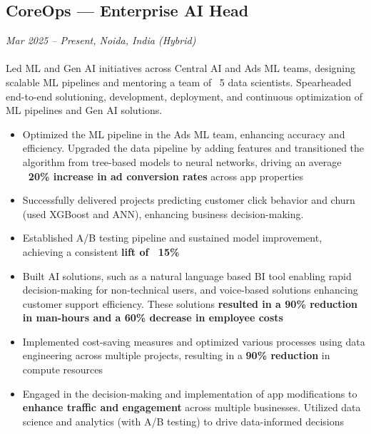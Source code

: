 \subsection*{CoreOps — Enterprise AI Head}
\textit{Mar 2025 – Present, Noida, India (Hybrid)}
\\
\\
Led ML and Gen AI initiatives across Central AI and Ads ML teams, designing scalable ML pipelines and mentoring a team of ~5 data scientists. Spearheaded end-to-end solutioning, development, deployment, and continuous optimization of ML pipelines and Gen AI solutions.
\begin{itemize}[leftmargin=1em]
    \item Optimized the ML pipeline in the Ads ML team, enhancing accuracy and efficiency. Upgraded the data pipeline by adding features and transitioned the algorithm from tree-based models to neural networks, driving an average \textbf{~20\% increase in ad conversion rates} across app properties
    \item Successfully delivered projects predicting customer click behavior and churn (used XGBoost and ANN), enhancing business decision-making.
    \item Established A/B testing pipeline and sustained model improvement, achieving a consistent \textbf{lift of ~15\%}
    \item Built AI solutions, such as a natural language based BI tool enabling rapid decision-making for non-technical users, and voice-based solutions enhancing customer support efficiency. These solutions \textbf{resulted in a 90\% reduction in man-hours and a 60\% decrease in employee costs}
    \item Implemented cost-saving measures and optimized various processes using data engineering across multiple projects, resulting in a \textbf{90\% reduction} in compute resources
    \item Engaged in the decision-making and implementation of app modifications to \textbf{enhance traffic and engagement} across multiple businesses. Utilized data science and analytics (with A/B testing) to drive data-informed decisions
\end{itemize}

